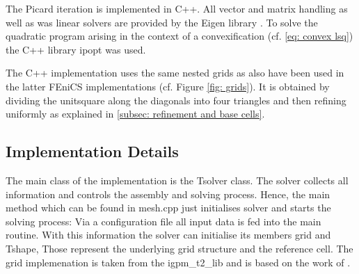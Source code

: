 The Picard iteration is implemented in C++. All vector and matrix handling as well as was linear solvers are provided by the Eigen library \cite{eigenweb}. To solve the quadratic program arising in the context of a convexification (cf. \eqref{eq: convex lsq}) the C++ library ipopt \cite{ipopt} was used.

The C++ implementation uses the same nested grids as also have been used in the latter FEniCS implementations (cf. Figure \ref{fig: grids}). It is obtained by dividing the unitsquare along the diagonals into four triangles and then refining uniformly as explained in \ref{subsec: refinement and base cells}.

\subsection{Implementation Details}

The main class of the implementation is the Tsolver class. The solver collects all information and controls the assembly and solving process.
Hence, the main method which can be found in mesh.cpp just initialises solver and starts the solving process: Via a configuration file all input data is fed into the main routine. With this information the solver can initialise its members grid and Tshape, Those represent the underlying grid structure and the reference cell. 
The grid implemenation is taken from the igpm\_t2\_lib and is based on the work of \cite{BMV2009}.

